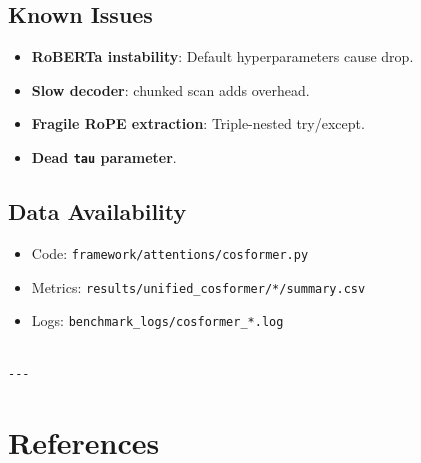 \subsection{Known Issues}

\begin{itemize}
\item \textbf{RoBERTa instability}: Default hyperparameters cause drop.
\item \textbf{Slow decoder}: chunked scan adds overhead.
\item \textbf{Fragile RoPE extraction}: Triple-nested try/except.
\item \textbf{Dead \texttt{tau} parameter}.

\end{itemize}
\subsection{Data Availability}

\begin{itemize}
\item Code: \texttt{framework/attentions/cosformer.py}
\item Metrics: \texttt{results/unified\_cosformer/*/summary.csv}
\item Logs: \texttt{benchmark\_logs/cosformer\_*.log}
\end{itemize}
\begin{lstlisting}

---
\end{lstlisting}


\section{References}

